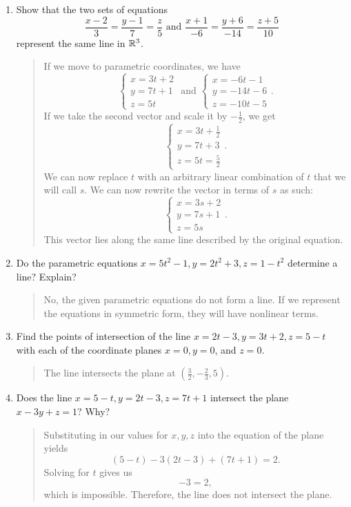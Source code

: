 \documentclass{hw}
\begin{document}
\begin{enumerate}
\item Show that the two sets of equations
\[
\frac{x-2}{3} = \frac{y-1}{7} = \frac{z}{5} \text{ and } \frac{x+1}{-6} = \frac{y+6}{-14} =
\frac{z+5}{10}
\]
represent the same line in $\mathbb{R}^{3}$.
\begin{quote}
If we move to parametric coordinates, we have
\[
\begin{cases}
x = 3t + 2\\
y = 7t + 1\\
z = 5t
\end{cases}
\text{ and }
\begin{cases}
x = -6t - 1\\
y = -14t - 6\\
z = -10t - 5
\end{cases}.
\]
If we take the second vector and scale it by $-\frac{1}{2}$, we get
\[
\begin{cases}
x = 3t + \frac{1}{2}\\
y = 7t + 3\\
z = 5t = \frac{5}{2}
\end{cases}.
\]
We can now replace $t$ with an arbitrary linear combination of $t$ that we will call $s$. We can now
rewrite the vector in terms of $s$ as such:
\[
\begin{cases}
x = 3s + 2\\
y = 7s + 1\\
z = 5s
\end{cases}.
\]
This vector lies along the same line described by the original equation.
\end{quote}

\item Do the parametric equations $x = 5t^{2} - 1, y = 2t^{2} + 3, z = 1 − t^{2}$ determine a line?
Explain?
\begin{quote}
No, the given parametric equations do not form a line. If we represent the equations in symmetric
form, they will have nonlinear terms.
\end{quote}

\item Find the points of intersection of the line $x = 2t − 3, y = 3t +2, z = 5-t$ with each of the
coordinate planes $x = 0, y = 0$, and $z = 0$.
\begin{quote}
The line intersects the plane at $(\frac{3}{2},-\frac{2}{3},5)$.
\end{quote}

\item Does the line $x = 5-t, y=2t-3, z=7t+1$ intersect the plane $x - 3y+z=1$? Why?
\begin{quote}
Substituting in our values for $x,y,z$ into the equation of the plane yields
\[
(5-t) - 3(2t-3) + (7t+1) = 2.
\]
Solving for $t$ gives us
\[
-3 = 2,
\]
which is impossible. Therefore, the line does not intersect the plane.
\end{quote}


\end{enumerate}
\end{document}
